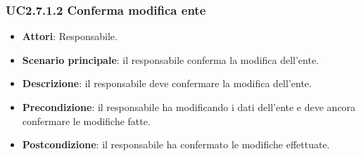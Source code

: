 \subsubsection{UC2.7.1.2 Conferma modifica ente}
\begin{itemize}
\item \textbf{Attori}: Responsabile.
\item \textbf{Scenario principale}: il responsabile conferma la modifica dell'ente.
\item \textbf{Descrizione}: il responsabile deve confermare la modifica dell'ente.
\item \textbf{Precondizione}: il responsabile ha modificando i dati dell'ente e deve ancora confermare le modifiche fatte.
\item \textbf{Postcondizione}: il responsabile ha confermato le modifiche effettuate.
\end{itemize}
